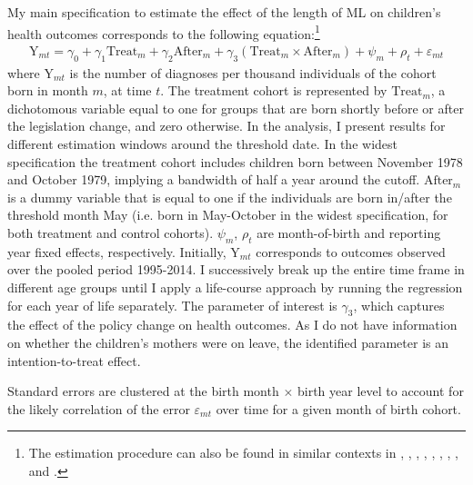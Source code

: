\documentclass[11pt, a4paper, draft]{article} %
\begin{document}
My main specification to estimate the effect of the length of ML on children's health outcomes corresponds to the following equation:\footnote{The estimation procedure can also be found in similar contexts in \cite{RafaelLaliveandJosefZweimuller2009}, \cite{Dustmann2012}, \cite{Ekberg2013parental}, \cite{schonberg2014expansions}, \cite{Lalive2014}, \cite{Huebener2017}, \cite{danzer2017}, \cite{guertzgen2018}, and \cite{avdic2018modern}.}
\begin{align}
\text{Y}_{mt} = \gamma_0 + \gamma_1 \text{Treat}_{m} + \gamma_2 \text{After}_{m} + \gamma_3 (\text{Treat}_{m} \times \text{After}_{m}) + \psi_m + \rho_t + \varepsilon_{mt} \label{eq:DD_basline}
\end{align}
where $\text{Y}_{mt}$ is the number of diagnoses per thousand individuals of the cohort born in month $m$, at time $t$. The treatment cohort is represented by $\text{Treat}_{m}$, a dichotomous variable equal to one for groups that are born shortly before or after the legislation change, and zero otherwise. In the analysis, I present results for different estimation windows around the threshold date. In the widest specification the treatment cohort includes children born between November 1978 and October 1979, implying a bandwidth of half a year around the cutoff. $\text{After}_{m}$ is a dummy variable that is equal to one if the individuals are born in/after the threshold month May (i.e. born in May-October in the widest specification, for both treatment and control cohorts). $\psi_m$, $\rho_t$ are month-of-birth and reporting year fixed effects, respectively. Initially, $\text{Y}_{mt}$ corresponds to outcomes observed over the pooled period 1995-2014. I successively break up the entire time frame in different age groups until I apply a life-course approach by running the regression for each year of life separately. The parameter of interest is $\gamma_3$, which captures the effect of the policy change on health outcomes. As I do not have information on whether the children's mothers were on leave, the identified parameter is an intention-to-treat effect.

Standard errors are clustered at the birth month $\times$ birth year level to account for the likely correlation of the error $\varepsilon_{mt}$ over time for a given month of birth cohort.
\end{document}
